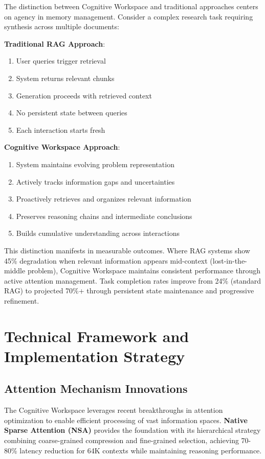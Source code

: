\documentclass[10pt,twocolumn]{article}
\begin{document}
The distinction between Cognitive Workspace and traditional approaches centers on agency in memory management. Consider a complex research task requiring synthesis across multiple documents:

\textbf{Traditional RAG Approach}:
\begin{enumerate}
\item User queries trigger retrieval
\item System returns relevant chunks
\item Generation proceeds with retrieved context
\item No persistent state between queries
\item Each interaction starts fresh
\end{enumerate}

\textbf{Cognitive Workspace Approach}:
\begin{enumerate}
\item System maintains evolving problem representation
\item Actively tracks information gaps and uncertainties
\item Proactively retrieves and organizes relevant information
\item Preserves reasoning chains and intermediate conclusions
\item Builds cumulative understanding across interactions
\end{enumerate}

This distinction manifests in measurable outcomes. Where RAG systems show 45\% degradation when relevant information appears mid-context (lost-in-the-middle problem), Cognitive Workspace maintains consistent performance through active attention management. Task completion rates improve from 24\% (standard RAG) to projected 70\%+ through persistent state maintenance and progressive refinement.

\section{Technical Framework and Implementation Strategy}

\subsection{Attention Mechanism Innovations}

The Cognitive Workspace leverages recent breakthroughs in attention optimization to enable efficient processing of vast information spaces. \textbf{Native Sparse Attention (NSA)} \cite{lu2025native} provides the foundation with its hierarchical strategy combining coarse-grained compression and fine-grained selection, achieving 70-80\% latency reduction for 64K contexts while maintaining reasoning performance.
\end{document}
